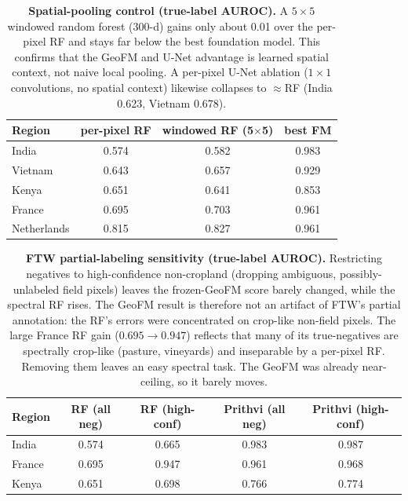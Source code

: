 \documentclass{article}
\begin{document}
\begin{table}[h]\centering\small
\caption{\textbf{Spatial-pooling control (true-label AUROC).} A $5\times5$ windowed
random forest (300-d) gains only about 0.01 over the per-pixel RF and stays far
below the best foundation model. This confirms that the GeoFM and U-Net advantage
is learned spatial context, not naive local pooling. A per-pixel U-Net ablation
($1\times1$ convolutions, no spatial context) likewise collapses to $\approx$RF
(India 0.623, Vietnam 0.678).}
\label{tab:windowed}
\begin{tabular}{lccc}
\toprule
Region & per-pixel RF & windowed RF (5$\times$5) & best FM \\
\midrule
India       & 0.574 & 0.582 & 0.983 \\
Vietnam     & 0.643 & 0.657 & 0.929 \\
Kenya       & 0.651 & 0.641 & 0.853 \\
France      & 0.695 & 0.703 & 0.961 \\
Netherlands & 0.815 & 0.827 & 0.961 \\
\bottomrule
\end{tabular}
\end{table}

\begin{table}[h]\centering\small
\caption{\textbf{FTW partial-labeling sensitivity (true-label AUROC).} Restricting
negatives to high-confidence non-cropland (dropping ambiguous, possibly-unlabeled
field pixels) leaves the frozen-GeoFM score barely changed, while the
spectral RF rises. The GeoFM result is therefore not an artifact of FTW's
partial annotation: the RF's errors were concentrated on crop-like non-field pixels.
The large France RF gain ($0.695 \to 0.947$) reflects that many of its true-negatives
are spectrally crop-like (pasture, vineyards) and inseparable by a per-pixel RF.
Removing them leaves an easy spectral task. The GeoFM was already near-ceiling, so
it barely moves.}
\label{tab:partial}
\begin{tabular}{lcccc}
\toprule
Region & RF (all neg) & RF (high-conf) & Prithvi (all neg) & Prithvi (high-conf) \\
\midrule
India  & 0.574 & 0.665 & 0.983 & 0.987 \\
France & 0.695 & 0.947 & 0.961 & 0.968 \\
Kenya  & 0.651 & 0.698 & 0.766 & 0.774 \\
\bottomrule
\end{tabular}
\end{table}
\end{document}
